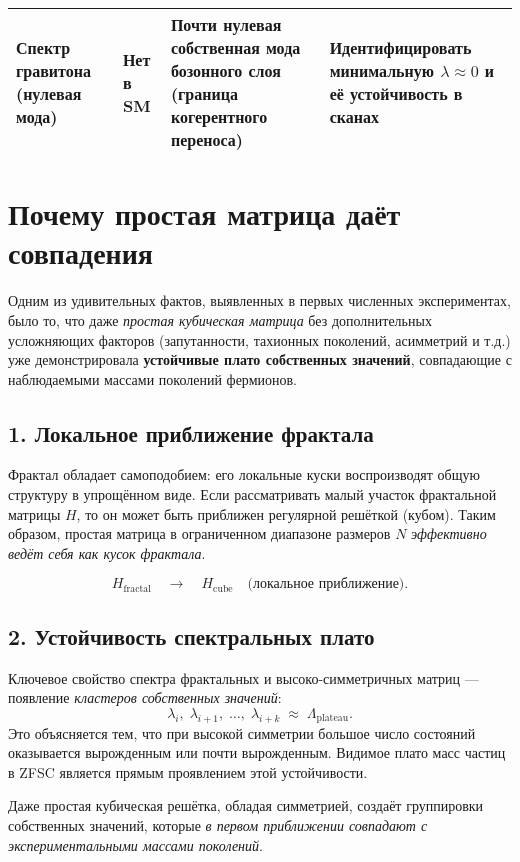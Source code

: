 \begin{table}[h!]
\begin{tabular}{p{3.4cm} p{3.6cm} p{6.2cm} p{4.2cm}}
Спектр гравитона (нулевая мода) &
Нет в SM &
Почти нулевая собственная мода бозонного слоя (граница когерентного переноса) &
Идентифицировать минимальную $\lambda\approx0$ и её устойчивость в сканах \\
\bottomrule
\end{tabular}

\section{Почему простая матрица даёт совпадения}

Одним из удивительных фактов, выявленных в первых численных экспериментах, было то, что даже \emph{простая кубическая матрица} без дополнительных усложняющих факторов (запутанности, тахионных поколений, асимметрий и т.д.) уже демонстрировала \textbf{устойчивые плато собственных значений}, совпадающие с наблюдаемыми массами поколений фермионов.

\subsection*{1. Локальное приближение фрактала}
Фрактал обладает самоподобием: его локальные куски воспроизводят общую структуру в упрощённом виде.  
Если рассматривать малый участок фрактальной матрицы $H$, то он может быть приближен регулярной решёткой (кубом).  
Таким образом, простая матрица в ограниченном диапазоне размеров $N$ \emph{эффективно ведёт себя как кусок фрактала}.

\[
H_{\text{fractal}} \quad\longrightarrow\quad H_{\text{cube}} \quad \text{(локальное приближение)}.
\]

\subsection*{2. Устойчивость спектральных плато}
Ключевое свойство спектра фрактальных и высоко-симметричных матриц --- появление \emph{кластеров собственных значений}:
\[
\lambda_{i},\;\lambda_{i+1},\;\dots,\;\lambda_{i+k} \;\approx\; \Lambda_{\text{plateau}}.
\]
Это объясняется тем, что при высокой симметрии большое число состояний оказывается вырожденным или почти вырожденным.  
Видимое плато масс частиц в ZFSC является прямым проявлением этой устойчивости.  

Даже простая кубическая решётка, обладая симметрией, создаёт группировки собственных значений, которые \emph{в первом приближении совпадают с экспериментальными массами поколений}.


\end{table}
